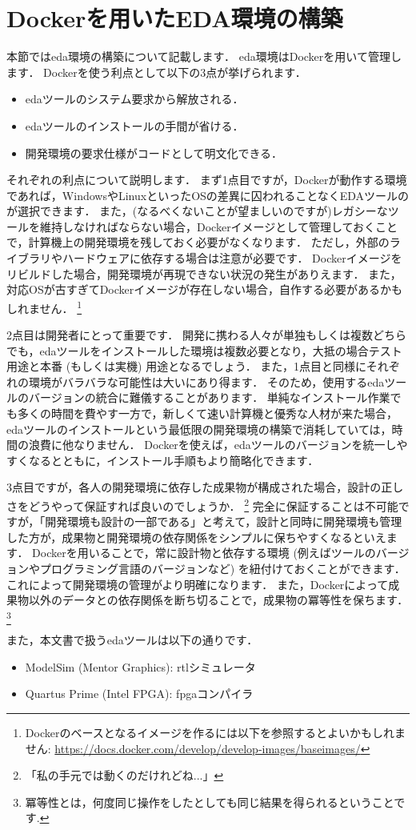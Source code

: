 \section{Dockerを用いたEDA環境の構築}

本節では\ac{eda}環境の構築について記載します．
\ac{eda}環境はDockerを用いて管理します．
Dockerを使う利点として以下の3点が挙げられます．
\begin{itemize}
  \item \ac{eda}ツールのシステム要求から解放される．
  \item \ac{eda}ツールのインストールの手間が省ける．
  \item 開発環境の要求仕様がコードとして明文化できる．
\end{itemize}
それぞれの利点について説明します．
まず1点目ですが，Dockerが動作する環境であれば，WindowsやLinuxといったOSの差異に囚われることなくEDAツールのが選択できます．
また，(なるべくないことが望ましいのですが)レガシーなツールを維持しなければならない場合，Dockerイメージとして管理しておくことで，計算機上の開発環境を残しておく必要がなくなります．
ただし，外部のライブラリやハードウェアに依存する場合は注意が必要です．
Dockerイメージをリビルドした場合，開発環境が再現できない状況の発生がありえます．
また，対応OSが古すぎてDockerイメージが存在しない場合，自作する必要があるかもしれません．
\footnote{Dockerのベースとなるイメージを作るには以下を参照するとよいかもしれません: \url{https://docs.docker.com/develop/develop-images/baseimages/}}

2点目は開発者にとって重要です．
開発に携わる人々が単独もしくは複数どちらでも，\ac{eda}ツールをインストールした環境は複数必要となり，大抵の場合テスト用途と本番 (もしくは実機) 用途となるでしょう．
また，1点目と同様にそれぞれの環境がバラバラな可能性は大いにあり得ます．
そのため，使用する\ac{eda}ツールのバージョンの統合に難儀することがあります．
単純なインストール作業でも多くの時間を費やす一方で，新しくて速い計算機と優秀な人材が来た場合，\ac{eda}ツールのインストールという最低限の開発環境の構築で消耗していては，時間の浪費に他なりません．
Dockerを使えば，\ac{eda}ツールのバージョンを統一しやすくなるとともに，インストール手順もより簡略化できます．

3点目ですが，各人の開発環境に依存した成果物が構成された場合，設計の正しさをどうやって保証すれば良いのでしょうか．
\footnote{「私の手元では動くのだけれどね...」}
完全に保証することは不可能ですが，「開発環境も設計の一部である」と考えて，設計と同時に開発環境も管理した方が，成果物と開発環境の依存関係をシンプルに保ちやすくなるといえます．
Dockerを用いることで，常に設計物と依存する環境 (例えばツールのバージョンやプログラミング言語のバージョンなど) を紐付けておくことができます．
これによって開発環境の管理がより明確になります．
また，Dockerによって成果物以外のデータとの依存関係を断ち切ることで，成果物の冪等性を保ちます．
\footnote{冪等性とは，何度同じ操作をしたとしても同じ結果を得られるということです.}


また，本文書で扱う\ac{eda}ツールは以下の通りです．
\begin{itemize}
  \item ModelSim (Mentor Graphics): \ac{rtl}シミュレータ
  \item Quartus Prime (Intel FPGA): \ac{fpga}コンパイラ
\end{itemize}
